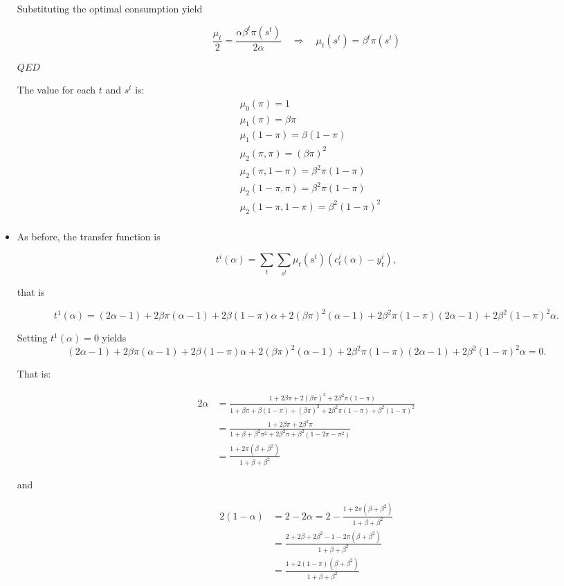 \documentclass[12pt,a4paper]{article}
\begin{document}
\begin{itemize}
  Substituting the optimal consumption yield

  $$
    \frac{\mu_t}{2} = \frac{\alpha\beta^t \pi(s^t)}{ 2 \alpha} \quad \Rightarrow \quad \mu_t(s^t) = \beta^t \pi(s^t)
  $$

  $QED$

  The value for each $t$ and $s^t$ is:
  \begin{align*}
    & \mu_0(\pi)  = 1 \\
    & \mu_1(\pi)  = \beta \pi \\
    & \mu_1(1 - \pi)  = \beta (1 - \pi) \\
    & \mu_2(\pi, \pi)  = (\beta \pi)^2 \\
    & \mu_2(\pi, 1 - \pi)  = \beta^2 \pi (1 - \pi) \\
    & \mu_2(1 - \pi, \pi)  = \beta^2 \pi (1 - \pi) \\
    & \mu_2(1 - \pi, 1 - \pi)  = \beta^2 (1 - \pi)^2 \\
  \end{align*}

  \item As before, the transfer function is

    $$
      t^i(\alpha) = \sum_{t} \sum_{s^t} \mu_t(s^t) \left( c_t^i(\alpha)- y_t^i \right),
    $$

  that is

    $$
    t^1(\alpha) = (2\alpha - 1) + 2\beta \pi(\alpha - 1) + 2\beta (1 - \pi)\alpha + 2(\beta \pi)^2 (\alpha - 1) + 2 \beta^2 \pi (1 - \pi) (2 \alpha - 1) + 2 \beta^2 (1 - \pi)^2 \alpha.
    $$

  Setting  $t^1(\alpha)=0$ yields
  $$
  (2\alpha - 1) + 2\beta \pi(\alpha - 1) + 2\beta (1 - \pi)\alpha + 2(\beta \pi)^2 (\alpha - 1) + 2 \beta^2 \pi (1 - \pi) (2 \alpha - 1) + 2 \beta^2 (1 - \pi)^2 \alpha = 0.
  $$

  That is:

  \begin{align*}
    2 \alpha & = \frac{1 + 2\beta\pi + 2 (\beta\pi)^2 + 2\beta^2\pi(1-\pi)}{1 + \beta\pi + \beta(1 - \pi) + (\beta\pi)^2 + 2 \beta^2\pi(1-\pi) + \beta^2 (1 - \pi)^2} \\
    & = \frac{1 + 2\beta\pi + 2\beta^2\pi }{1 + \beta + \beta^2\pi^2 + 2\beta^2 \pi + \beta^2(1-2\pi-\pi^2)} \\
    & = \frac{1 + 2\pi(\beta + \beta^2)}{1 + \beta + \beta^2}
  \end{align*}

  and

  \begin{align*}
    2(1-\alpha) & = 2 - 2\alpha = 2 -\frac{1 + 2\pi(\beta + \beta^2)}{1 + \beta + \beta^2} \\
    & = \frac{2 + 2\beta + 2 \beta^2 - 1 - 2\pi(\beta + \beta^2)}{1 + \beta + \beta^2} \\
    & = \frac{1 + 2(1 -\pi)(\beta + \beta^2)}{1 + \beta + \beta^2}
  \end{align*}


\end{itemize}
\end{document}
